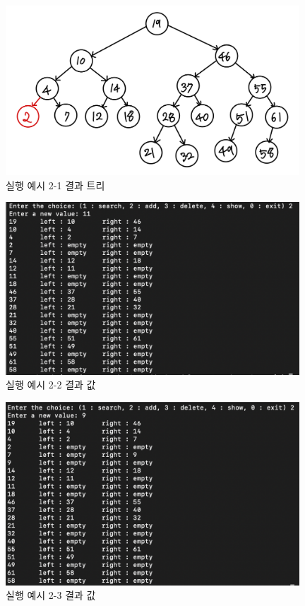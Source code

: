 \documentclass{article}
\begin{document}
\begin{figure}
\centering
   \includegraphics[width=11cm]{tree-2.jpeg}
   \hfil
\caption{실행 예시 2-1 결과 트리}
\label{tree-2}
\end{figure}

\begin{figure}
\centering
   \includegraphics[width=11cm]{ex_2-2.png}
   \hfil
\caption{실행 예시 2-2 결과 값}
\label{ex2-2}
\end{figure}

\begin{figure}
\centering
   \includegraphics[width=11cm]{ex_2-3.png}
   \hfil
\caption{실행 예시 2-3 결과 값}
\label{ex2-3}
\end{figure}
\end{document}
